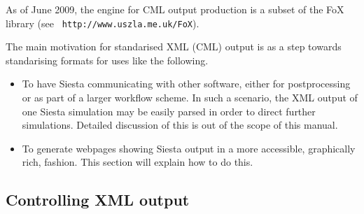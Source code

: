 \documentclass[11pt]{article}
\begin{document}
As of June 2009, the engine for CML output production is a subset of
the FoX library (see {\tt
  http://www.uszla.me.uk/FoX}).

The main motivation for standarised XML (CML) output is as a step
towards standarising formats for uses like the following.

\begin{itemize}

\item To have {\sc Siesta} communicating with other software, either
for postprocessing or as part of a larger workflow scheme. In such a
scenario, the XML output of one {\sc Siesta} simulation may be easily parsed
in order to direct further simulations. Detailed discussion of this is
out of the scope of this manual.

\item To generate webpages showing {\sc Siesta} output in a more accessible,
graphically rich, fashion. This section will explain how to do this.

\end{itemize}

\subsection{Controlling XML output}
\end{document}
